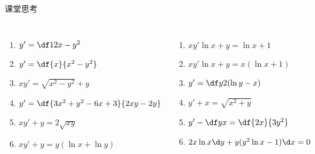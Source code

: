 \begin{frame}{课堂思考}
	\linespread{1.4}
	\begin{columns}
			\begin{enumerate}
			  \item $y'=\df1{2x-y^2}$
			  \item $y'=\df{x}{x^2-y^2}$
			  \item $xy'=\sqrt{x^2-y^2}+y$
			  \item $y'=\df{3x^2+y^2-6x+3}{2xy-2y}$
			  \item $xy'+y=2\sqrt{xy}$
			  \item $xy'+y=y(\ln x+\ln y)$
			\end{enumerate}
			\begin{enumerate}
			  \addtocounter{enumi}{6}
			  \item $xy'\ln x+y=\ln x+1$
			  \item $xy'\ln x+y=x(\ln x+1)$
			  \item $y'=\df y{2(\ln y-x)}$
			  \item $y'+x=\sqrt{x^2+y}$
			  \item $y'-\df yx=\df{2x}{3y^2}$
			  \item $2x\ln x\d y+y(y^2\ln x-1)\d x=0$
			\end{enumerate}
	\end{columns}
\end{frame}